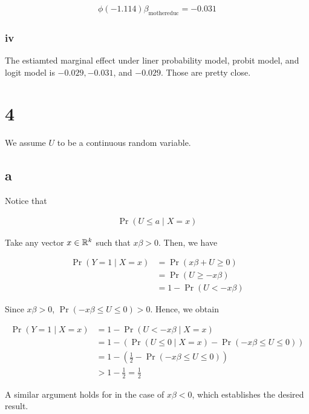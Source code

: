 \documentclass[11pt]{article}
\begin{document}
\begin{align*}
    \phi(-1.114) \beta_{\text{mothereduc}} = -0.031
\end{align*}

\subsubsection*{iv}

The estiamted marginal effect under liner probability model, probit model, and logit model is $-0.029, -0.031$, and $-0.029$. Those are pretty close.

\section*{4}

We assume $U$ to be a continuous random variable.

\subsection*{a}\label{q:4_a}

Notice that

\begin{align*}
    \Pr(U \leq a \mid X = x)
\end{align*}

Take any vector $x\in \mathbb{R}^k$ such that $x\beta > 0$. Then, we have

\begin{align*}
    \Pr(Y = 1 \mid X = x)
    &= \Pr(x\beta + U \geq 0) \\
    &= \Pr(U \geq - x\beta) \\
    &= 1 - \Pr(U < - x\beta)
\end{align*}

Since $x\beta > 0$, $\Pr(- x\beta \leq U \leq 0) > 0$. Hence, we obtain

\begin{align*}
    \Pr(Y = 1 \mid X = x)
    &= 1 - \Pr(U < - x\beta \mid X = x) \\
    &= 1 - \left( \Pr(U \leq 0 \mid X = x) - \Pr(- x\beta \leq U \leq 0) \right) \\
    &= 1 - \left( \frac{1}{2} - \Pr(- x\beta \leq U \leq 0) \right) \\
    &> 1 - \frac{1}{2} = \frac{1}{2}
\end{align*}

A similar argument holds for in the case of $x\beta < 0$, which establishes the desired result.
\end{document}
